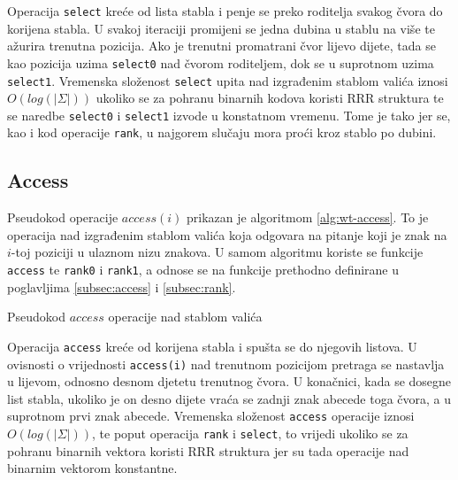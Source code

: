 \documentclass[times, utf8, seminar, numeric]{fer}
\begin{document}
Operacija \texttt{select} kreće od lista stabla i penje se preko roditelja svakog čvora do korijena stabla. U svakoj iteraciji promijeni se jedna dubina u stablu na više te ažurira trenutna pozicija. Ako je trenutni promatrani čvor lijevo dijete, tada se kao pozicija uzima \texttt{select0} nad čvorom roditeljem, dok se u suprotnom uzima \texttt{select1}. Vremenska složenost \texttt{select} upita nad izgrađenim stablom valića iznosi $O(log(|\Sigma|))$ ukoliko se za pohranu binarnih kodova koristi RRR struktura te se naredbe \texttt{select0} i \texttt{select1} izvode u konstatnom vremenu. Tome je tako jer se, kao i kod operacije \texttt{rank}, u najgorem slučaju mora proći kroz stablo po dubini. 

\subsection{Access}
Pseudokod operacije $access(i)$ prikazan je algoritmom \ref{alg:wt-access}. To je operacija nad izgrađenim stablom valića koja odgovara na pitanje koji je znak na $i$-toj poziciji u ulaznom nizu znakova. U samom algoritmu koriste se funkcije \texttt{access} te \texttt{rank0} i \texttt{rank1}, a odnose se na funkcije prethodno definirane u poglavljima \ref{subsec:access} i \ref{subsec:rank}.

\begin{algorithm}[H]
 \caption{Pseudokod $access$ operacije nad stablom valića}
 \label{alg:wt-access}
\end{algorithm}

Operacija \texttt{access} kreće od korijena stabla i spušta se do njegovih listova. U ovisnosti o vrijednosti \texttt{access(i)} nad trenutnom pozicijom pretraga se nastavlja u lijevom, odnosno desnom djetetu trenutnog čvora. U konačnici, kada se dosegne list stabla, ukoliko je on desno dijete vraća se zadnji znak abecede toga čvora, a u suprotnom prvi znak abecede. Vremenska složenost \texttt{access} operacije iznosi $O(log(|\Sigma|))$, te poput operacija \texttt{rank} i \texttt{select}, to vrijedi ukoliko se za pohranu binarnih vektora koristi RRR struktura jer su tada operacije nad binarnim vektorom konstantne. 
\end{document}
